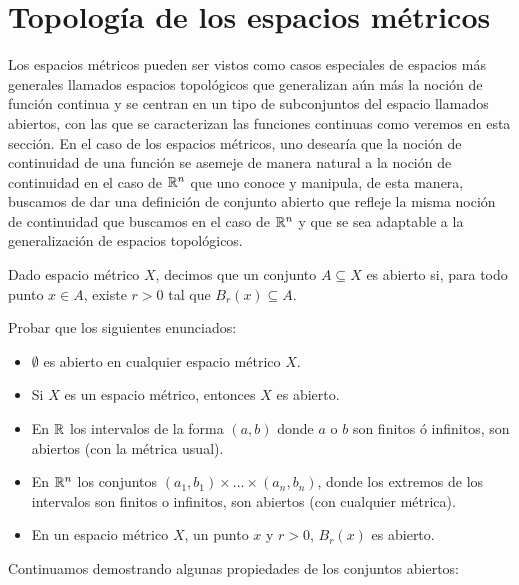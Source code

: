 \documentclass[12pt,a4paper]{book}
\begin{document}
\else
\fi

\section{Topología de los espacios métricos}
Los espacios métricos pueden ser vistos como casos especiales de espacios más generales llamados espacios topológicos que generalizan aún más la noción de función continua y se centran en un tipo de subconjuntos del espacio llamados abiertos, con las que se caracterizan las funciones continuas como veremos en esta sección. En el caso de los espacios métricos, uno desearía que la noción de continuidad de una función se asemeje de manera natural a la noción de continuidad en el caso de $\mathbb{R}^n$ que uno conoce y manipula, de esta manera, buscamos de dar una definición de conjunto abierto que refleje la misma noción de continuidad que buscamos en el caso de $\mathbb{R}^n$ y que se sea adaptable a la generalización de espacios topológicos.
\begin{defi}
Dado espacio métrico $X$, decimos que un conjunto $A \subseteq X$ es abierto si, para todo punto $x\in A$, existe $r>0$ tal que $B_r(x) \subseteq A$.
\end{defi}
\begin{ej} Probar que los siguientes enunciados:
\begin{itemize}
\item $\emptyset$ es abierto en cualquier espacio métrico $X$.
\item Si $X$ es un espacio métrico, entonces $X$ es abierto.
\item En $\mathbb{R}$ los intervalos de la forma $(a,b)$ donde $a$ o $b$ son finitos ó infinitos, son abiertos (con la métrica usual).
\item En $\mathbb{R}^n$ los conjuntos $(a_1,b_1) \times \ldots \times (a_n,b_n)$, donde los extremos de los intervalos son finitos o infinitos, son abiertos (con cualquier métrica).
\item En un espacio métrico $X$, un punto $x$ y $r>0$, $B_r(x)$ es abierto.
\end{itemize}
\end{ej}
Continuamos demostrando algunas propiedades de los conjuntos abiertos:
\end{document}

